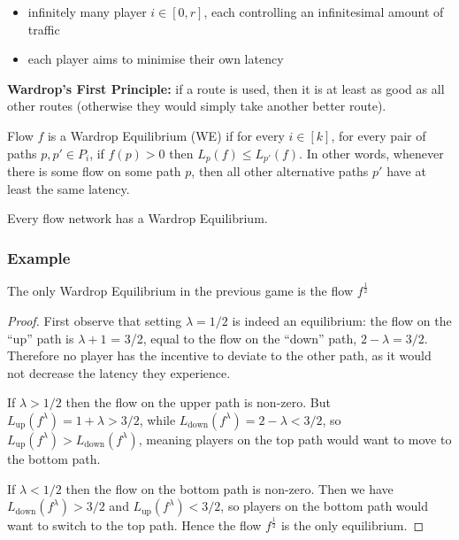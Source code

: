 \begin{itemize}
	\item infinitely many player $i \in [0, r]$, each controlling an
		infinitesimal amount of traffic
	\item each player aims to minimise their own latency
\end{itemize}

\textbf{Wardrop's First Principle:} if a route is used, then it is at least as
good as all other routes (otherwise they would simply take another better
route).

\begin{definition}
	Flow $f$ is a Wardrop Equilibrium (WE) if for every $i \in [k]$, for every
	pair of paths $p, p' \in P_i$, if $f(p) > 0$ then $L_p(f) \le L_{p'}(f)$.
	In other words, whenever there is some flow on some path $p$, then all
	other alternative paths $p'$ have at least the same latency.
\end{definition}

\begin{fact}
	Every flow network has a Wardrop Equilibrium.
\end{fact}

\subsubsection{Example}

\begin{claim}
	The only Wardrop Equilibrium in the previous game is the flow
	$f^\frac{1}{2}$
\end{claim}
\begin{proof}
	First observe that setting $\lambda = 1/2$ is indeed an equilibrium: the
	flow on the ``up'' path is $\lambda + 1$ = 3/2, equal to the flow on the
	``down'' path, $2 - \lambda = 3/2$. Therefore no player has the incentive
	to deviate to the other path, as it would not decrease the latency they
	experience.

	If $\lambda > 1/2$ then the flow on the upper path is non-zero. But
	$L_\text{up}(f^\lambda) = 1 + \lambda > 3/2$, while
	$L_\text{down}(f^\lambda) = 2 - \lambda < 3/2$, so $L_\text{up}(f^\lambda)
	> L_\text{down}(f^\lambda)$, meaning players on the top path would want to
	move to the bottom path.

	If $\lambda < 1/2$ then the flow on the bottom path is non-zero. Then we
	have $L_\text{down}(f^\lambda) > 3/2$ and $L_\text{up}(f^\lambda) < 3/2$,
	so players on the bottom path would want to switch to the top path. Hence
	the flow $f^\frac{1}{2}$ is the only equilibrium.
\end{proof}

